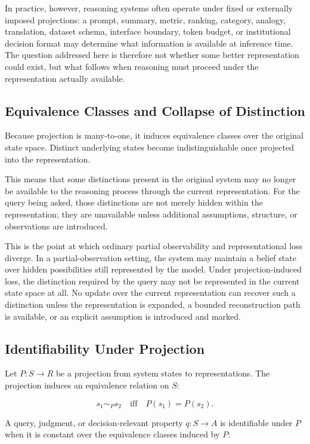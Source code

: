 \documentclass[11pt]{article}
\theoremstyle{definition}
\theoremstyle{remark}
\begin{document}
In practice, however, reasoning systems often operate under fixed or externally imposed projections: a prompt, summary, metric, ranking, category, analogy, translation, dataset schema, interface boundary, token budget, or institutional decision format may determine what information is available at inference time. The question addressed here is therefore not whether some better representation could exist, but what follows when reasoning must proceed under the representation actually available.

\subsection{Equivalence Classes and Collapse of Distinction}

Because projection is many-to-one, it induces equivalence classes over the original state space. Distinct underlying states become indistinguishable once projected into the representation.

This means that some distinctions present in the original system may no longer be available to the reasoning process through the current representation. For the query being asked, those distinctions are not merely hidden within the representation; they are unavailable unless additional assumptions, structure, or observations are introduced.

This is the point at which ordinary partial observability and representational loss diverge. In a partial-observation setting, the system may maintain a belief state over hidden possibilities still represented by the model. Under projection-induced loss, the distinction required by the query may not be represented in the current state space at all. No update over the current representation can recover such a distinction unless the representation is expanded, a bounded reconstruction path is available, or an explicit assumption is introduced and marked.

\subsection{Identifiability Under Projection}

Let $P:S\rightarrow R$ be a projection from system states to representations. The projection induces an equivalence relation on $S$:

\[
s_1 \sim_P s_2 \quad \text{iff} \quad P(s_1)=P(s_2).
\]

A query, judgment, or decision-relevant property $q:S\rightarrow A$ is identifiable under $P$ when it is constant over the equivalence classes induced by $P$:
\end{document}
